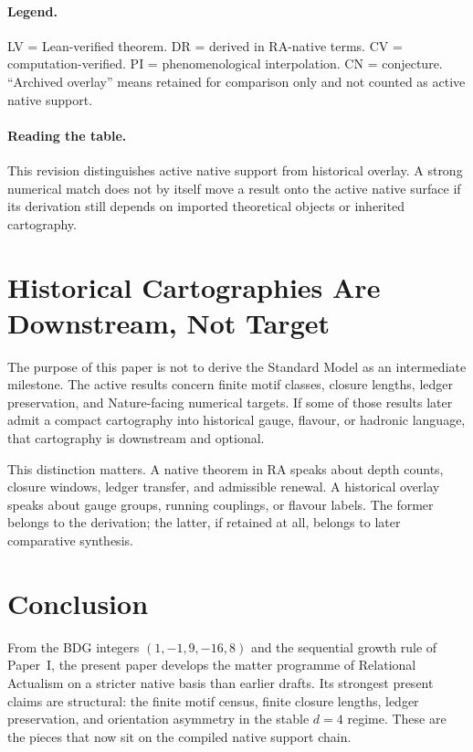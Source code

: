 \documentclass[11pt]{article}
\begin{document}
\paragraph{Legend.} LV = Lean-verified theorem. DR = derived in RA-native terms. CV = computation-verified. PI = phenomenological interpolation. CN = conjecture. ``Archived overlay'' means retained for comparison only and not counted as active native support.

\paragraph{Reading the table.} This revision distinguishes active native support from historical overlay. A strong numerical match does not by itself move a result onto the active native surface if its derivation still depends on imported theoretical objects or inherited cartography.

\section{Historical Cartographies Are Downstream, Not Target}
\label{sec:sm}

The purpose of this paper is not to derive the Standard Model as an intermediate milestone. The active results concern finite motif classes, closure lengths, ledger preservation, and Nature-facing numerical targets. If some of those results later admit a compact cartography into historical gauge, flavour, or hadronic language, that cartography is downstream and optional.

This distinction matters. A native theorem in RA speaks about depth counts, closure windows, ledger transfer, and admissible renewal. A historical overlay speaks about gauge groups, running couplings, or flavour labels. The former belongs to the derivation; the latter, if retained at all, belongs to later comparative synthesis.

\section{Conclusion}
\label{sec:conclusion}

From the BDG integers $(1,-1,9,-16,8)$ and the sequential growth rule of Paper~I, the present paper develops the matter programme of Relational Actualism on a stricter native basis than earlier drafts. Its strongest present claims are structural: the finite motif census, finite closure lengths, ledger preservation, and orientation asymmetry in the stable $d=4$ regime. These are the pieces that now sit on the compiled native support chain.
\end{document}
